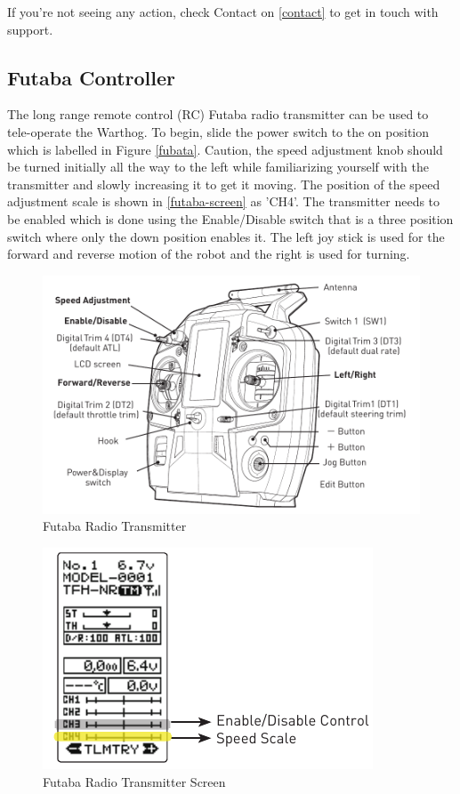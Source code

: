 \documentclass[]{clearpath-latex/clearpath-manual}
\begin{document}
If you’re not seeing any action, check Contact on \autoref{contact} to get in touch with support.

\subsection{Futaba Controller}

The long range remote control (RC) Futaba radio transmitter can be used to tele-operate the Warthog.
To begin, slide the power switch to the on position which is labelled in Figure \autoref{fubata}.
Caution, the speed adjustment knob should be turned initially all the way to the left while familiarizing yourself with the transmitter and slowly increasing it to get it moving.
The position of the speed adjustment scale is shown in  \autoref{futaba-screen} as 'CH4'.
The transmitter needs to be enabled which is done using the Enable/Disable switch that is a three position switch where only the down position enables it.
The left joy stick is used for the forward and reverse motion of the robot and the right is used for turning.



\begin{figure}[!h]
  \centering
  \includegraphics[width=1.0\linewidth]{futaba.pdf}
  \caption{Futaba Radio Transmitter}
  \label{futaba}
\end{figure}

\begin{figure}[!h]
  \centering
  \includegraphics[width=1.0\linewidth]{futaba-screen.pdf}
  \caption{Futaba Radio Transmitter Screen}
  \label{futaba-screen}
\end{figure}
\end{document}
